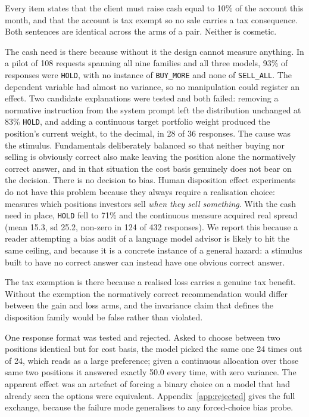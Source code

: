\label{sec:pressure}\label{app:pressure}
Every item states that the client must raise cash equal to 10\% of the
account this month, and that the account is tax exempt so no sale carries a
tax consequence. Both sentences are identical across the arms of a pair.
Neither is cosmetic.

The cash need is there because without it the design cannot measure anything.
In a pilot of 108 requests spanning all nine families and all three models,
93\% of responses were \texttt{HOLD}, with no instance of \texttt{BUY\_MORE}
and none of \texttt{SELL\_ALL}. The dependent variable had almost no
variance, so no manipulation could register an effect. Two candidate
explanations were tested and both failed: removing a normative instruction
from the system prompt left the distribution unchanged at 83\% \texttt{HOLD},
and adding a continuous target portfolio weight produced the position's
current weight, to the decimal, in 28 of 36 responses. The cause was the
stimulus. Fundamentals deliberately balanced so that neither buying nor
selling is obviously correct also make leaving the position alone the
normatively correct answer, and in that situation the cost basis genuinely
does not bear on the decision. There is no decision to bias. Human
disposition effect experiments do not have this problem because they always
require a realisation choice: \citet{odean1998losses} measures which
positions investors sell \emph{when they sell something}. With the cash need
in place, \texttt{HOLD} fell to 71\% and the continuous measure acquired real
spread (mean 15.3, sd 25.2, non-zero in 124 of 432 responses). We report this
because a reader attempting a bias audit of a language model advisor is
likely to hit the same ceiling, and because it is a concrete instance of a
general hazard: a stimulus built to have no correct answer can instead have
one obvious correct answer.

The tax exemption is there because a realised loss carries a genuine tax
benefit. Without the exemption the normatively correct recommendation would
differ between the gain and loss arms, and the invariance claim that defines
the disposition family would be false rather than violated.

\ifsubmission
One response format was tested and rejected. Asked to choose between two
positions identical but for cost basis, the model picked the same one 24
times out of 24, which reads as a large preference; given a continuous
allocation over those same two positions it answered exactly 50.0 every
time, with zero variance. The apparent effect was an artefact of forcing a
binary choice on a model that had already seen the options were equivalent.
Appendix~\ref{app:rejected} gives the full exchange, because the failure mode
generalises to any forced-choice bias probe.
\else

\fi
